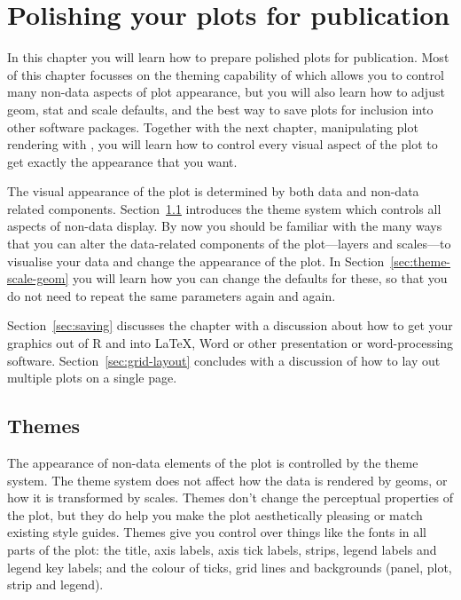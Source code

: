 

% 


\chapter{Polishing your plots for publication}
\label{cha:polishing}

In this chapter you will learn how to prepare polished plots for publication.  Most of this chapter focusses on the theming capability of \ggplot which allows you to control many non-data aspects of plot appearance, but you will also learn how to adjust geom, stat and scale defaults, and the best way to save plots for inclusion into other software packages.  Together with the next chapter, manipulating plot rendering with , you will learn how to control every visual aspect of the plot to get exactly the appearance that you want. 

The visual appearance of the plot is determined by both data and non-data related components.  Section~\ref{sec:themes} introduces the theme system which controls all aspects of non-data display.  By now you should be familiar with the many ways that you can alter the data-related components of the plot---layers and scales---to visualise your data and change the appearance of the plot.  In Section~\ref{sec:theme-scale-geom} you will learn how you can change the defaults for these, so that you do not need to repeat the same parameters again and again.

Section~\ref{sec:saving} discusses the chapter with a discussion about how to get your graphics out of R and into \LaTeX, Word or other presentation or word-processing software.  Section~\ref{sec:grid-layout} concludes with a discussion of how to lay out multiple plots on a single page.


\section{Themes} 
\label{sec:themes}

The appearance of non-data elements of the plot is controlled by the theme system. The theme system does not affect how the data is rendered by geoms, or how it is transformed by scales. Themes don't change the perceptual properties of the plot, but they do help you make the plot aesthetically pleasing or match existing style guides. Themes give you control over things like the fonts in all parts of the plot: the title, axis labels, axis tick labels, strips, legend labels and legend key labels; and the colour of ticks, grid lines and backgrounds (panel, plot, strip and legend).  

